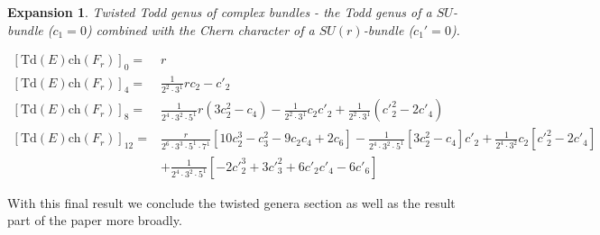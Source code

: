 \documentclass{amsart}
\theoremstyle{plain}
\newcommand{\ch}{\mathrm{ch}}
\newcommand{\Td}{\mathrm{Td}}
\numberwithin{equation}{section}
\newtheorem{ex}{Expansion}
\begin{document}
\begin{ex}
Twisted Todd genus of complex bundles - the Todd genus of a  $ SU $-bundle ($c_1=0$) combined with the Chern character of a  $ SU(r) $-bundle ($c_1'=0$).
\end{ex} 

%
%
%
%
%
%
%



\begin{tcolorbox}[text width=16cm, height=4cm,
title=Twisted Todd genus of complex bundles $c_1$ $c_1'$ zero]
{\footnotesize
\begin{align*} 
{[\Td(E)\ch(F_r)]}_0= & r
\\
{[\Td(E)\ch(F_r)]}_4 = &
\tfrac{1}{2^2\cdot 3^1} r c_2 - c'_2
\\
{[\Td(E)\ch(F_r)]}_8 = &
\tfrac{1}{2^4\cdot 3^2\cdot 5^1} r \left(3 c_2^2-c_4\right)
- \tfrac{1}{2^2\cdot 3^1} c_2 c'_2
+\tfrac{1}{2^2\cdot 3^1} \left({c'}_2^2-2 c'_4\right)
\\
{[\Td(E)\ch(F_r)]}_{12} = &
\tfrac{r}{2^6\cdot 3^3\cdot 5^1\cdot 7^1} [10 c_2^3-c_3^2 - 9 c_2  c_4+2 c_6]
- \tfrac{1}{2^4\cdot 3^2\cdot 5^1}[3 c_2^2-c_4]c'_2
 +
 \tfrac{1}{2^4\cdot 3^2} c_2[{c'}_2^2- 2 c'_4]
 \\
 &
+
\tfrac{1}{2^4\cdot 3^2\cdot 5^1} 
[-2 {c'}_2^3+3 {c'}_3^2
+ 6 c'_2  c'_4-6 c'_6]
\end{align*}
}
\end{tcolorbox}






\medskip
With this final result we conclude the twisted genera section as well as the result part of the paper more broadly.
\end{document}
